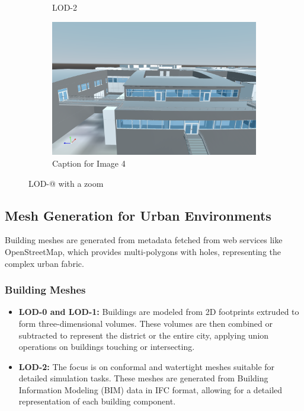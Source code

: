 \documentclass[runningheads]{llncs}
\begin{document}
\begin{figure}[htbp]
\begin{subfigure}{.4\textwidth}
  \caption{LOD-2}
  \label{fig:sub3}
\end{subfigure}%
\begin{subfigure}{.4\textwidth}
  \centering
  \includegraphics[width=\linewidth]{buildings-lod2-zoom.png}
  \caption{Caption for Image 4}
  \label{fig:sub4}
\end{subfigure}
\caption{LOD-@ with a zoom}
\label{fig:test}
\end{figure}

\subsection{Mesh Generation for Urban Environments}
Building meshes are generated from metadata fetched from web services like OpenStreetMap, which provides multi-polygons with holes, representing the complex urban fabric.


\subsubsection{Building Meshes}
\begin{itemize}
    \item \textbf{LOD-0 and LOD-1:} Buildings are modeled from 2D footprints extruded to form three-dimensional volumes. These volumes are then combined or subtracted to represent the district or the entire city, applying union operations on buildings touching or intersecting.
    \item \textbf{LOD-2:} The focus is on conformal and watertight meshes suitable for detailed simulation tasks. These meshes are generated from Building Information Modeling (BIM) data in IFC format, allowing for a detailed representation of each building component.
\end{itemize}
\end{document}

